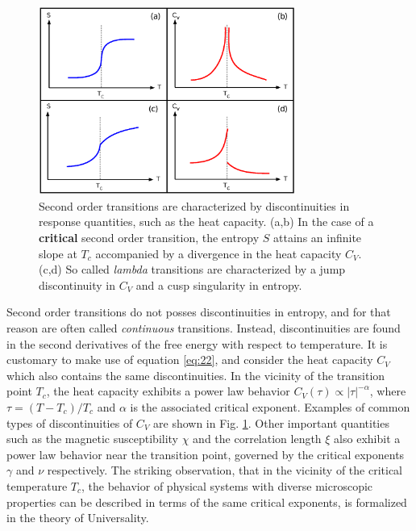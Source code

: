 \documentclass[12pt]{report}
\begin{document}
\begin{figure}
\center
\includegraphics[width = 0.75\textwidth]{chapter2Figs/CanonicalSecondOrder.eps}
\caption{\label{fig:Fig_4}%
Second order transitions are characterized by discontinuities in response quantities, such as the heat capacity. (a,b) In the case of a \textbf{critical} second order transition, the entropy $S$ attains an infinite slope at $T_{c}$ accompanied by a divergence in the heat capacity $C_{V}$. (c,d) So called \textit{lambda} transitions are characterized by a jump discontinuity in $C_{V}$ and a cusp singularity in entropy.}
\end{figure}

Second order transitions do not posses discontinuities in entropy, and for that reason are often called \textit{continuous} transitions. Instead, discontinuities are found in the second derivatives of the free energy with respect to temperature. It is customary to make use of equation\,\,\ref{eq:22}, and consider the heat capacity $C_{V}$ which also contains the same discontinuities.
In the vicinity of the transition point $T_{c}$, the heat capacity exhibits a power law behavior $C_{V}(\tau) \propto \left| \tau \right|^{-\alpha}$, where $\tau = \left(T-T_{c}\right)/T_{c}$ and $\alpha$ is the associated critical exponent. Examples of common types of discontinuities of $C_{V}$ are shown in Fig. \ref{fig:Fig_4}. Other important quantities such as the magnetic susceptibility $\chi$ and the correlation length $\xi$ also exhibit a power law behavior near the transition point, governed by the critical exponents $\gamma$ and $\nu$ respectively. The striking observation, that in the vicinity of the critical temperature $T_{c}$, the behavior of physical systems with diverse microscopic properties can be described in terms of the same critical exponents, is formalized in the theory of Universality\cite{Kardar2009}. 
\end{document}
